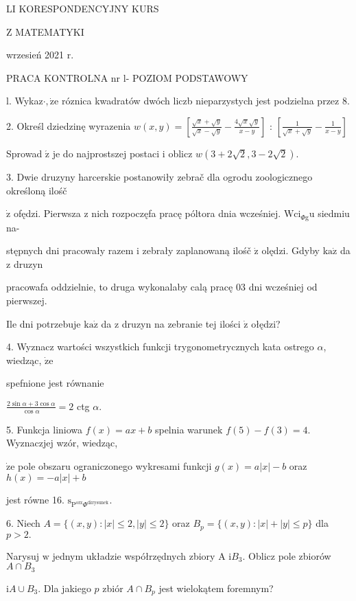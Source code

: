 \documentclass[a4paper,12pt]{article}
\begin{document}
LI KORESPONDENCYJNY KURS

Z MATEMATYKI

wrzesień 2021 r.

PRACA KONTROLNA nr l- POZIOM PODSTAWOWY

l. Wykaz$\cdot, \dot{\mathrm{z}}\mathrm{e}$ róznica kwadratów dwóch liczb nieparzystych jest podzielna przez 8.

2. Określ dziedzinę wyrazenia $w(x,y)= [\displaystyle \frac{\sqrt{x}+\sqrt{y}}{\sqrt{x}-\sqrt{y}}-\frac{4\sqrt{x}\sqrt{y}}{x-y}]$ : $[\displaystyle \frac{1}{\sqrt{x}+\sqrt{y}}-\frac{1}{x-y}]$

Sprowad $\acute{\mathrm{z}}$ je do najprostszej postaci $\mathrm{i}$ oblicz $w(3+2\sqrt{2},3-2\sqrt{2}).$

3. Dwie druzyny harcerskie postanowiły zebrač dla ogrodu zoologicznego określoną ilośč

$\dot{\mathrm{z}}$ ofędzi. Pierwsza $\mathrm{z}$ nich rozpoczęfa pracę póltora dnia wcześniej. $\mathrm{W}\mathrm{c}\mathrm{i}_{\Phi \mathrm{g}}\mathrm{u}$ siedmiu na-

stępnych dni pracowały razem $\mathrm{i}$ zebrały zaplanowaną ilośč $\dot{\mathrm{z}}$ olędzi. Gdyby $\mathrm{k}\mathrm{a}\dot{\mathrm{z}}$ da $\mathrm{z}$ druzyn

pracowafa oddzielnie, to druga wykonalaby calą pracę $03$ dni wcześniej od pierwszej.

Ile dni potrzebuje $\mathrm{k}\mathrm{a}\dot{\mathrm{z}}$ da $\mathrm{z}$ druzyn na zebranie tej ilości $\dot{\mathrm{z}}$ ołędzi?

4. Wyznacz wartości wszystkich funkcji trygonometrycznych kata ostrego $\alpha$, wiedząc, $\dot{\mathrm{z}}\mathrm{e}$

spefnione jest równanie

$\displaystyle \frac{2\sin\alpha+3\cos\alpha}{\cos\alpha}=2$ ctg $\alpha.$

5. Funkcja liniowa $f(x)=ax+b$ spelnia warunek $f(5)-f(3)=4$. Wyznaczjej wzór, wiedząc,

$\dot{\mathrm{z}}\mathrm{e}$ pole obszaru ograniczonego wykresami funkcji $g(x)=a|x|-b$ oraz $h(x)=-a|x|+b$

jest równe 16. $\mathrm{s}_{\mathrm{P}^{\mathrm{o}\mathrm{r}\mathrm{z}}\Phi^{\mathrm{d}\acute{\mathrm{z}}\mathrm{r}\mathrm{y}\mathrm{s}\mathrm{u}\mathrm{n}\mathrm{e}\mathrm{k}}}.$

6. Niech $A= \{(x,y):|x|\leq 2,|y|\leq 2\}$ oraz $B_{p}= \{(x,y):|x|+|y|\leq p\}$ dla $p> 2.$

Narysuj $\mathrm{w}$ jednym układzie współrzędnych zbiory A $\mathrm{i}B_{3}$. Oblicz pole zbiorów $A\cap B_{3}$

$\mathrm{i} A\cup B_{3}$. Dla jakiego $p$ zbiór $A\cap B_{p}$ jest wielokątem foremnym?
\end{document}
